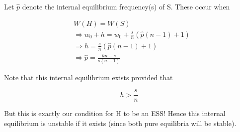 \documentclass{article}
\begin{document}
Let $\hat{p}$ denote the internal equilibrium frequency(s) of S. These
occur when

\begin{align*}
    &W(H) = W(S) \\
    &\Rightarrow w_0 + h = w_0 + \frac{s}{n} (\hat{p} (n - 1) + 1) \\
    &\Rightarrow h = \frac{s}{n} (\hat{p} (n - 1) + 1) \\
    &\Rightarrow \hat{p} = \frac{h n - s}{s (n - 1)}
\end{align*}

Note that this internal equilibrium exists provided that

\begin{equation*}
    h > \frac{s}{n}
\end{equation*}

But this is exactly our condition for H to be an ESS! Hence this
internal equilibrium is unstable if it exists (since both pure
equilibria will be stable).
\end{document}
